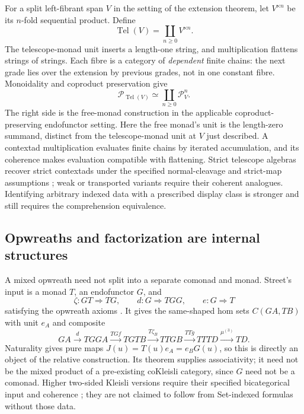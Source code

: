 \documentclass[11pt]{article}
\theoremstyle{definition}
\newcommand{\Tel}{\operatorname{Tel}}
\begin{document}
For a split left-fibrant span $V$ in the setting of the extension theorem,
let $V^{\ltimes n}$ be its $n$-fold sequential product. Define
\[
 \Tel(V)=\coprod_{n\geq0}V^{\ltimes n}.
\]
The telescope-monad unit inserts a length-one string, and multiplication
flattens strings of strings. Each fibre is a category of \emph{dependent}
finite chains: the next grade lies over the extension by previous grades,
not in one constant fibre. Monoidality and coproduct preservation give
\begin{equation}\label{eq:telescope}
 \mathcal P_{\Tel(V)}\simeq\coprod_{n\geq0}\mathcal P_V^n.
\end{equation}
The right side is the free-monad construction in the applicable
coproduct-preserving endofunctor setting. Here the free monad's unit is the
length-zero summand, distinct from the telescope-monad unit at $V$ just
described. A contextad multiplication evaluates finite chains by iterated
accumulation, and its coherence makes evaluation compatible with flattening.
Strict telescope algebras recover strict contextads under the specified
normal-cleavage and strict-map assumptions
\cite[Corollary 2.20]{Kamiya}; weak or transported variants require their
coherent analogues. Identifying arbitrary indexed data with a prescribed
display class is stronger and still requires the comprehension equivalence.

\subsection{Opwreaths and factorization are internal structures}

A mixed opwreath need not split into a separate comonad and monad. Street's
input is a monad $T$, an endofunctor $G$, and
\[
 \zeta:GT\Rightarrow TG,\qquad d:G\Rightarrow TGG,\qquad e:G\Rightarrow T
\]
satisfying the opwreath axioms \cite[Definition 5 and Proposition 7]{Street}.
It gives the same-shaped hom sets $C(GA,TB)$ with unit $e_A$ and composite
\[
 GA\xrightarrow{d}TGGA\xrightarrow{TGf}TGTB
 \xrightarrow{T\zeta_B}TTGB\xrightarrow{TTg}TTTD
 \xrightarrow{\mu^{(3)}}TD.
\]
Naturality gives pure maps $J(u)=T(u)e_A=e_BG(u)$, so this is directly an
object of the relative construction. Its theorem supplies associativity;
it need not be the mixed product of a pre-existing coKleisli category, since
$G$ need not be a comonad. Higher two-sided Kleisli versions require their
specified bicategorical input and coherence \cite{Garner}; they are not
claimed to follow from Set-indexed formulas without those data.
\end{document}
